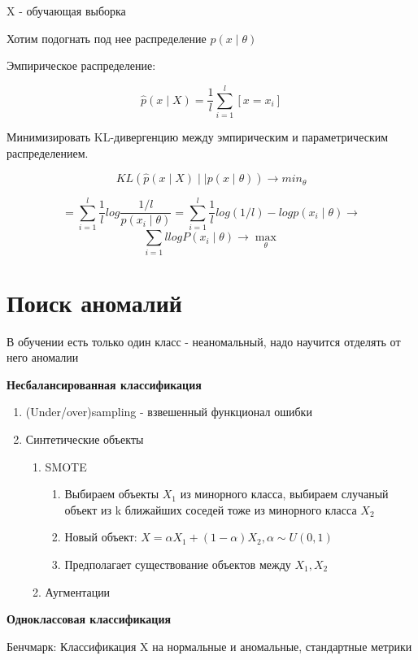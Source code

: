 \documentclass[a4paper, 12pt]{article}
\begin{document}
X - обучающая выборка

Хотим подогнать под нее распределение $p(x \mid \theta)$

Эмпирическое распределение:

\[\hat{p}(x \mid X) = \frac{1}{l}\sum^{l}_{i = 1}[x = x_i]\]

Минимизировать KL-дивергенцию между эмпирическим и 
параметрическим распределением.

\[KL(\hat{p}(x \mid X) \mid \mid p(x \mid \theta)) 
\rightarrow min_{\theta}\]

\[= \sum_{i = 1}^{l} 
\frac{1}{l}log  \frac{1 / l}{p(x_i \mid \theta)} = 
\sum_{i = 1}^{l} 
\frac{1}{l}log(1 / l) - logp(x_i \mid \theta) \rightarrow \]
\[\sum_{i = 1}{l} logP(x_i \mid \theta) \rightarrow \max_{\theta}\]

\section{Поиск аномалий}

В обучении есть только один класс - неаномальный, 
надо научится отделять от него аномалии

\textbf{Несбалансированная классификация}
\begin{enumerate}
    \item (Under/over)sampling - взвешенный 
    функционал ошибки
    \item Синтетические объекты
    \begin{enumerate}
        \item SMOTE
        \begin{enumerate}
            \item Выбираем объекты $X_1$ из минорного класса,
            выбираем случаный объект из k ближайших соседей
            тоже из минорного класса $X_2$
            \item Новый объект: \(X = \alpha X_1 + (1 - \alpha)X_2, 
            \alpha \sim U(0, 1)\)
            \item Предполагает существование объектов между $X_1, X_2$
        \end{enumerate}
    \item Аугментации
    \end{enumerate}
\end{enumerate}

\textbf{Одноклассовая классификация}

Бенчмарк: Классификация X на нормальные и аномальные, 
стандартные метрики
\end{document}
